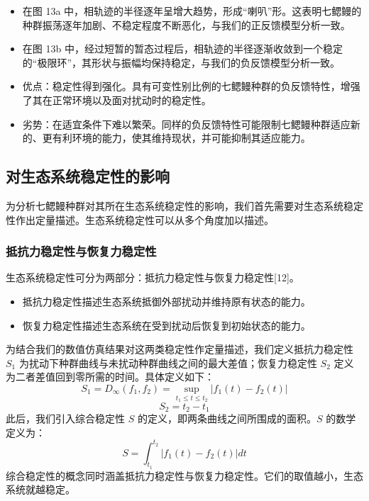 \documentclass[11pt,a4paper]{ctexart}
\begin{document}
\begin{itemize}
\item 在图 13a 中，相轨迹的半径逐年呈增大趋势，形成“喇叭”形。这表明七鳃鳗的种群振荡逐年加剧、不稳定程度不断恶化，与我们的正反馈模型分析一致。
\item 在图 13b 中，经过短暂的暂态过程后，相轨迹的半径逐渐收敛到一个稳定的“极限环”，其形状与振幅均保持稳定，与我们的负反馈模型分析一致。
\item 优点：稳定性得到强化。具有可变性别比例的七鳃鳗种群的负反馈特性，增强了其在正常环境以及面对扰动时的稳定性。
\item 劣势：在适宜条件下难以繁荣。同样的负反馈特性可能限制七鳃鳗种群适应新的、更有利环境的能力，使其维持现状，并可能抑制其适应能力。
\end{itemize}

\subsection{对生态系统稳定性的影响}

为分析七鳃鳗种群对其所在生态系统稳定性的影响，我们首先需要对生态系统稳定性作出定量描述。生态系统稳定性可以从多个角度加以描述。

\subsubsection{抵抗力稳定性与恢复力稳定性}

生态系统稳定性可分为两部分：抵抗力稳定性与恢复力稳定性[12]。

\begin{itemize}
\item 抵抗力稳定性描述生态系统抵御外部扰动并维持原有状态的能力。
\item 恢复力稳定性描述生态系统在受到扰动后恢复到初始状态的能力。
\end{itemize}

为结合我们的数值仿真结果对这两类稳定性作定量描述，我们定义抵抗力稳定性 $S_1$ 为扰动下种群曲线与未扰动种群曲线之间的最大差值；恢复力稳定性 $S_2$ 定义为二者差值回到零所需的时间。具体定义如下：
\begin{equation}
S_1=D_\infty\left(f_1,f_2\right)=\sup_{t_1\leqslant t\leqslant t_2}\left|f_1(t)-f_2(t)\right| \tag{17}
\end{equation}
\begin{equation}
S_2=t_2-t_1 \tag{18}
\end{equation}
此后，我们引入综合稳定性 $S$ 的定义，即两条曲线之间所围成的面积。$S$ 的数学定义为：
\begin{equation}
S=\int_{t_1}^{t_2}\left|f_1(t)-f_2(t)\right|dt \tag{19}
\end{equation}
综合稳定性的概念同时涵盖抵抗力稳定性与恢复力稳定性。它们的取值越小，生态系统就越稳定。
\end{document}
